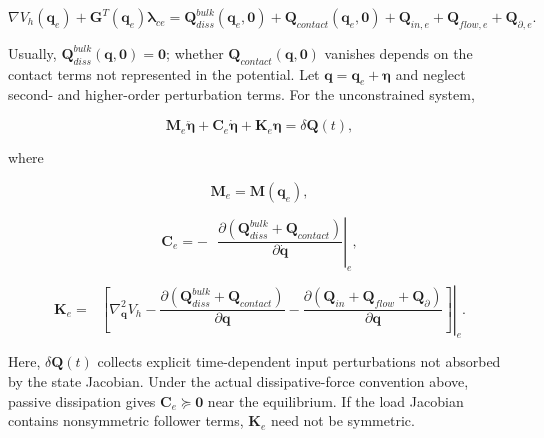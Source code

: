 \begin{equation}
\label{eq:galerkin-2-109}
\nabla V_{h}\left( \mathbf{q}_{e} \right) + \mathbf{G}^{T}\left( \mathbf{q}_{e} \right)\bm{\lambda}_{ce} = \mathbf{Q}_{diss}^{bulk}\left( \mathbf{q}_{e},\mathbf{0} \right) + \mathbf{Q}_{contact}\left( \mathbf{q}_{e},\mathbf{0} \right) + \mathbf{Q}_{in,e} + \mathbf{Q}_{flow,e} + \mathbf{Q}_{\partial,e}.
\end{equation}

Usually, \(\mathbf{Q}_{diss}^{bulk}\left( \mathbf{q},\mathbf{0} \right) = \mathbf{0}\); whether \(\mathbf{Q}_{contact}\left( \mathbf{q},\mathbf{0} \right)\) vanishes depends on the contact terms not represented in the potential. Let \(\mathbf{q} = \mathbf{q}_{e} + \bm{\eta}\) and neglect second- and higher-order perturbation terms. For the unconstrained system,

\begin{equation}
\label{eq:galerkin-2-110}
\mathbf{M}_{e}\ddot{\bm{\eta}} + \mathbf{C}_{e}\dot{\bm{\eta}} + \mathbf{K}_{e}\bm{\eta} = \delta\mathbf{Q}(t),
\end{equation}

where

\begin{equation}
\label{eq:galerkin-2-111}
\mathbf{M}_{e} = \mathbf{M}\left( \mathbf{q}_{e} \right),
\end{equation}

\begin{equation}
\label{eq:galerkin-2-112}
\mathbf{C}_{e} = - \left. \ \ \ \frac{\partial\left(\mathbf{Q}_{diss}^{bulk}+\mathbf{Q}_{contact}\right)}{\partial\dot{\mathbf{q}}} \right|_{e},
\end{equation}

\begin{equation}
\label{eq:galerkin-2-113}
\boxed{\mathbf{K}_{e} = \left. \ \ \ \left\lbrack \nabla_{\mathbf{q}}^{2}V_{h} - \frac{\partial\left(\mathbf{Q}_{diss}^{bulk}+\mathbf{Q}_{contact}\right)}{\partial\mathbf{q}} - \frac{\partial\left( \mathbf{Q}_{in} + \mathbf{Q}_{flow} + \mathbf{Q}_{\partial} \right)}{\partial\mathbf{q}} \right\rbrack \right|_{e}.}
\end{equation}

Here, \(\delta\mathbf{Q}(t)\) collects explicit time-dependent input perturbations not absorbed by the state Jacobian. Under the actual dissipative-force convention above, passive dissipation gives \(\mathbf{C}_{e} \succcurlyeq \mathbf{0}\) near the equilibrium. If the load Jacobian contains nonsymmetric follower terms, \(\mathbf{K}_{e}\) need not be symmetric.

